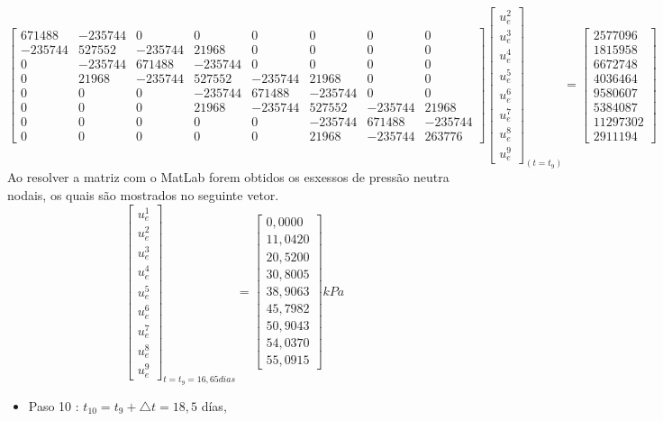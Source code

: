 \documentclass{article} %
\begin{document}
\begin{equation*}
\begin{bmatrix}
671488& -235744& 0& 0& 0& 0& 0& 0\\
-235744&527552&-235744&21968& 0& 0& 0& 0\\
0&-235744&671488&-235744& 0& 0& 0& 0\\
0&21968&-235744&527552&-235744&21968& 0& 0\\
0&0&0& -235744&671488&-235744& 0& 0\\
0&0&0&21968&-235744&527552&-235744&21968\\
0&0&0&0&0&-235744&671488&-235744\\
0&0&0&0&0&21968&-235744&263776
\end{bmatrix}\begin{bmatrix}
u_e^2\\
u_e^3\\
u_e^4\\
u_e^5\\
u_e^6\\
u_e^7\\
u_e^8\\
u_e^9
\end{bmatrix}_{(t=t_9)}
=\begin{bmatrix}
2577096\\
1815958\\
6672748\\
4036464\\
9580607\\
5384087\\
11297302\\
2911194
\end{bmatrix}
\end{equation*}
\indent Ao resolver a matriz com o MatLab forem obtidos os esxessos de pressão neutra nodais, os quais são mostrados no seguinte vetor.
\begin{equation}\label{t9}
\begin{bmatrix}
u_e^1\\
u_e^2\\
u_e^3\\
u_e^4\\
u_e^5\\
u_e^6\\
u_e^7\\
u_e^8\\
u_e^9
\end{bmatrix}_{t=t_9=16,65dias}=\begin{bmatrix}
0,0000\\
11,0420\\
20,5200\\
30,8005\\
38,9063\\
45,7982\\
50,9043\\
54,0370\\
55,0915
\end{bmatrix}kPa
\end{equation}
\begin{itemize}
	\item Paso 10 : \(t_10=t_9+\triangle t=18,5\) días,
\end{itemize}
\end{document}
